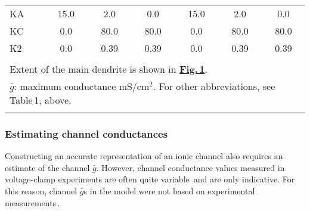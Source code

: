 \documentclass[12pt]{article}
\begin{document}
\begin{table}[!h]
\begin{tabular}{ l c c c c c c }
KA              &15.0             & 2.0                                     & 0.0                              & 15.0             & 2.0                      & 0.0                                                  \\
KC              & 0.0              & 80.0                                   & 80.0                            & 0.0               & 80.0                    & 80.0                                                \\
K2              & 0.0              & 0.39                                    & 0.39                            & 0.0               & 0.39                   & 0.39                                                \\
                   &                     &                                            &                                      &                     &                             &                                                         \\
\multicolumn{7}{l}{Extent of the main dendrite is shown in \href{../pub-purkinje-deschutter-fig-1/pub-purkinje-deschutter-fig-1.tex}{\bf Fig.\,1}.}                                                                                                                                 \\
\multicolumn{7}{l}{$\bar g$: maximum conductance mS/cm$^2$. For other abbreviations, see Table\,1, above.}                                                \\
\multicolumn{7}{l}{}                                                                                                                                                                                                                   \\
\end{tabular}
\end{table}

\subsubsection*{Estimating channel conductances}

Constructing an accurate
representation of an ionic channel also requires an estimate of
the channel $\bar g$. However, channel conductance values measured in
voltage-clamp experiments are often quite variable\,\cite{McCormick:1992fk} and are only indicative. For this reason,
channel $\bar g$s in the model were not based on experimental measurements\,\cite{S:1993dz, De-Schutter-E:1993fu}.
\end{document}
